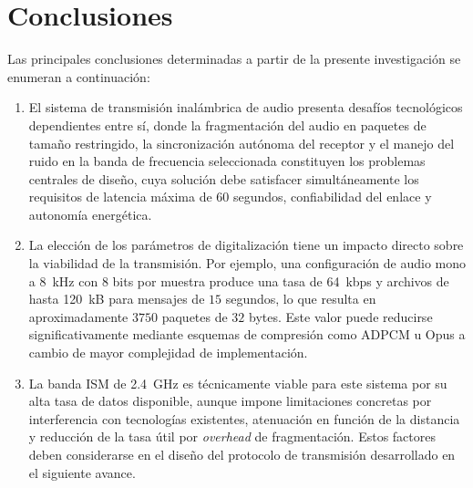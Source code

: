 
\section{Conclusiones}

Las principales conclusiones determinadas a partir de la presente investigación se enumeran a continuación:

\begin{enumerate}
    \item El sistema de transmisión inalámbrica de audio presenta desafíos tecnológicos dependientes entre sí, donde la fragmentación del audio en paquetes de tamaño restringido, la sincronización autónoma del receptor y el manejo del ruido en la banda de frecuencia seleccionada constituyen los problemas centrales de diseño, cuya solución debe satisfacer simultáneamente los requisitos de latencia máxima de 60 segundos, confiabilidad del enlace y autonomía energética.
    
    \item La elección de los parámetros de digitalización tiene un impacto directo sobre la viabilidad de la transmisión.
    Por ejemplo, una configuración de audio mono a \SI{8}{\kilo\hertz} con $8$ bits por muestra produce una tasa de \SI{64}{kbps} y archivos de hasta \SI{120}{kB} para mensajes de $15$ segundos, lo que resulta en aproximadamente $3750$ paquetes de $32$ bytes.
    Este valor puede reducirse significativamente mediante esquemas de compresión como ADPCM u Opus a cambio de mayor complejidad de implementación.
    
    \item La banda ISM de \SI{2.4}{\giga\hertz} es técnicamente viable para este sistema por su alta tasa de datos disponible, aunque impone limitaciones concretas por interferencia con tecnologías existentes, atenuación en función de la distancia y reducción de la tasa útil por \textit{overhead} de fragmentación.
    Estos factores deben considerarse en el diseño del protocolo de transmisión desarrollado en el siguiente avance.
\end{enumerate}